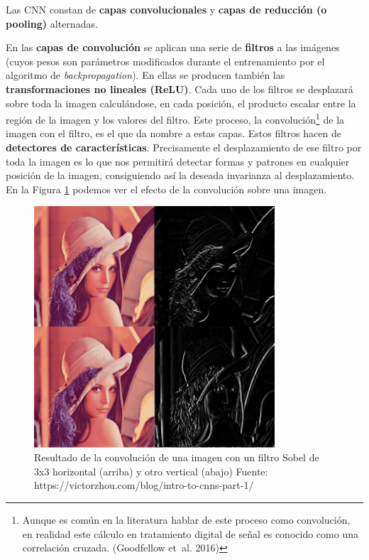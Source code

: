 \documentclass[
  12pt,
  spanish,
  a4paperpaper,
]{report}
\begin{document}
Las CNN constan de \textbf{capas convolucionales} y \textbf{capas de
reducción (o pooling)} alternadas.

En las \textbf{capas de convolución} se aplican una serie de
\textbf{filtros} a las imágenes (cuyos pesos son parámetros modificados
durante el entrenamiento por el algoritmo de \emph{backpropagation}). En
ellas se producen también las \textbf{transformaciones no lineales
(ReLU)}. Cada uno de los filtros se desplazará sobre toda la imagen
calculándose, en cada posición, el producto escalar entre la región de
la imagen y los valores del filtro. Este proceso, la
convolución\footnote{Aunque es común en la literatura hablar de este
  proceso como convolución, en realidad este cálculo en tratamiento
  digital de señal es conocido como una correlación cruzada. (Goodfellow
  et~al. 2016)} de la imagen con el filtro, es el que da nombre a estas
capas. Estos filtros hacen de \textbf{detectores de características}.
Precisamente el desplazamiento de ese filtro por toda la imagen es lo
que nos permitirá detectar formas y patrones en cualquier posición de la
imagen, consiguiendo así la deseada invarianza al desplazamiento. En la
Figura \ref{lena} podemos ver el efecto de la convolución sobre una
imagen.

\begin{figure}
\centering
\includegraphics[width=0.8\textwidth,height=\textheight]{source/figures/lena.png}
\caption{Resultado de la convolución de una imagen con un filtro Sobel
de 3x3 horizontal (arriba) y otro vertical (abajo) Fuente:
https://victorzhou.com/blog/intro-to-cnns-part-1/ \label{lena}}
\end{figure}
\end{document}

